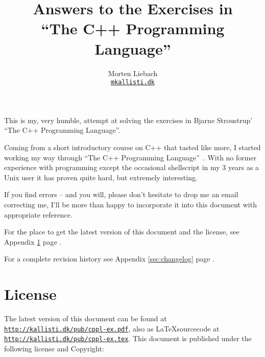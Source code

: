 \documentclass[a4paper,11pt,oneside]{scrartcl}
\title{Answers to the Exercises in \\
``The C++ Programming Language''}
\author{Morten Liebach \\
\texttt{\href{mailto:m\at kallisti.dk}{m\at kallisti.dk}}}
\begin{document}

\maketitle

\abstract


This is my, very humble, attempt at solving the exercises in Bjarne
Stroustrup' ``The C++ Programming Language''.

Coming from a short introductory course on C++ that tasted like more, I
started working my way through ``The C++ Programming
Language''~\cite{stroustrup}. With no former experience with programming
except the occasional shellscript in my 3 years as a Unix user it has proven
quite hard, but extremely interesting.

If you find errors -- and you will, please don't hesitate to drop me an
email correcting me, I'll be more than happy to incorporate it into this
document with appropriate reference.

 

For the place to get the latest version of this document and the license,
see Appendix \ref{sec:license} page \pageref{sec:license}.

For a complete revision history see Appendix \ref{sec:changelog} page
\pageref{sec:changelog}.



\appendix %

\newpage
\section{License} %
\label{sec:license}


The latest version of this document can be found at
\texttt{\href{http://kallisti.dk/pub/cppl-ex.pdf}
{http://kallisti.dk/pub/cppl-ex.pdf}}, also as \LaTeX sourcecode at
\texttt{\href{http://kallisti.dk/pub/cppl-ex.tex}
{http://kallisti.dk/pub/cppl-ex.tex}}. This document is published under the
following license and Copyright:
\end{document}
